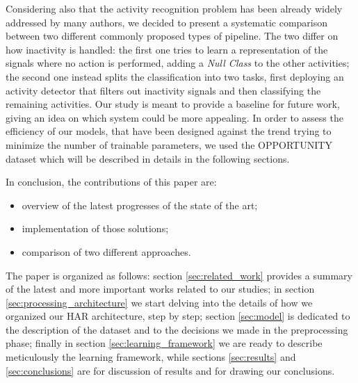 Considering also that the activity recognition problem has been already widely addressed by many authors, we decided to present a systematic comparison between two different commonly proposed types of pipeline.
The two differ on how inactivity is handled: the first one tries to learn a representation of the signals where no action is performed, adding a \textit{Null Class} to the other activities; the second one instead splits the classification into two tasks, first deploying an activity detector that filters out inactivity signals and then classifying the remaining activities.
Our study is meant to provide a baseline for future work, giving an idea on which system could be more appealing.
In order to assess the efficiency of our models, that have been designed against the trend trying to minimize the number of trainable parameters, we used the OPPORTUNITY dataset \cite{Chavarriaga2013, ComplexAct-2010} which will be described in details in the following sections.

In conclusion, the contributions of this paper are:
\begin{itemize}
	\item overview of the latest progresses of the state of the art;
	\item implementation of those solutions;
	\item comparison of two different approaches. 
\end{itemize}
 
The paper is organized as follows: section \ref{sec:related_work} provides a summary of the latest and more important works related to our studies; in section \ref{sec:processing_architecture} we start delving into the details of how we organized our HAR architecture, step by step; section \ref{sec:model} is dedicated to the description of the dataset and to the decisions we made in the preprocessing phase; finally in section \ref{sec:learning_framework} we are ready to describe meticulously the learning framework, while sections \ref{sec:results} and \ref{sec:conclusions} are for discussion of results and for drawing our conclusions. 